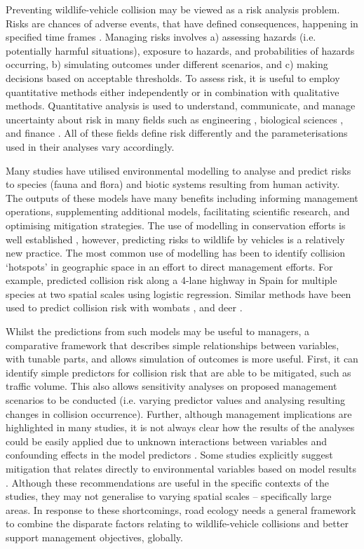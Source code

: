 Preventing wildlife-vehicle collision may be viewed as a risk analysis problem. Risks are chances of adverse events, that have defined consequences, happening in specified time frames \citep{burg05}. Managing risks involves a) assessing hazards (i.e. potentially harmful situations), exposure to hazards, and probabilities of hazards occurring, b) simulating outcomes under different scenarios, and c) making decisions based on acceptable thresholds. To assess risk, it is useful to employ quantitative methods either independently or in combination with qualitative methods. Quantitative analysis is used to understand, communicate, and manage uncertainty about risk in many fields such as engineering \citep[e.g.][]{apos04}, biological sciences \citep[e.g.][]{sute16}, and finance \citep[e.g.][]{mcne15}.  All of these fields define risk differently and the parameterisations used in their analyses vary accordingly.

Many studies have utilised environmental modelling to analyse and predict risks to species (fauna and flora) and biotic systems resulting from human activity. The outputs of these models have many benefits including informing management operations, supplementing additional models, facilitating scientific research, and optimising mitigation strategies. The use of modelling in conservation efforts is well established \citep{star86}, however, predicting risks to wildlife by vehicles is a relatively new practice. The most common use of modelling has been to identify collision `hotspots' in geographic space in an effort to direct management efforts. For example, \cite{malo04} predicted collision risk along a 4-lane highway in Spain for multiple species at two spatial scales using logistic regression. Similar methods have been used to predict collision risk with wombats \citep{roge09}, and deer \citep{sudh09}.

Whilst the predictions from such models may be useful to managers, a comparative framework that describes simple relationships between variables, with tunable parts, and allows simulation of outcomes is more useful. First, it can identify simple predictors for collision risk that are able to be mitigated, such as traffic volume. This also allows sensitivity analyses on proposed management scenarios to be conducted (i.e. varying predictor values and analysing resulting changes in collision occurrence). Further, although management implications are highlighted in many studies, it is not always clear how the results of the analyses could be easily applied due to unknown interactions between variables and confounding effects in the model predictors \citep{guns11}. Some studies explicitly suggest mitigation that relates directly to environmental variables based on model results \citep[e.g.][]{gril09}.  Although these recommendations are useful in the specific contexts of the studies, they may not generalise to varying spatial scales -- specifically large areas. In response to these shortcomings, road ecology needs a general framework to combine the disparate factors relating to wildlife-vehicle collisions \citep{clev15} and better support management objectives, globally.

